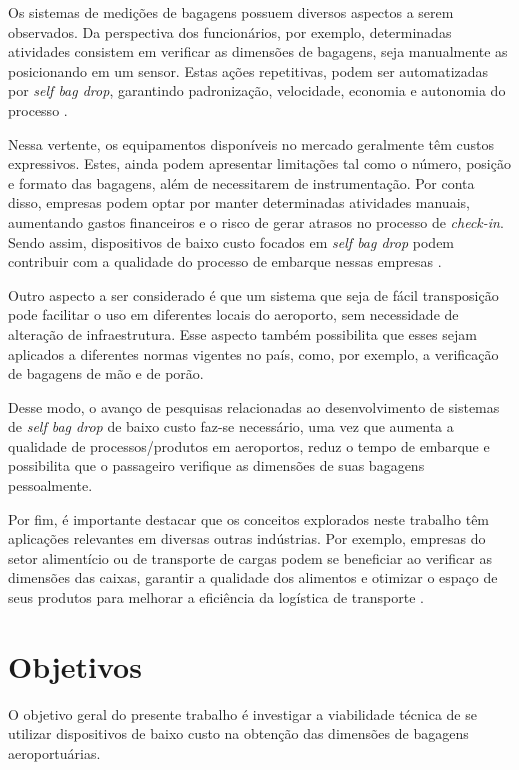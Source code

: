 Os sistemas de medições de bagagens possuem diversos aspectos a serem observados. Da perspectiva dos funcionários, por exemplo, determinadas atividades consistem em verificar as dimensões de bagagens, seja manualmente as posicionando em um sensor. Estas ações repetitivas, podem ser automatizadas por \textit{self bag drop}, garantindo padronização, velocidade, economia e autonomia do processo \cite{zheng_2018_smart, neethu_2015_role}.

Nessa vertente, os equipamentos disponíveis no mercado geralmente têm custos expressivos. Estes, ainda podem apresentar limitações tal como o número, posição e formato das bagagens, além de necessitarem de instrumentação. Por conta disso, empresas podem optar por manter determinadas atividades manuais, aumentando gastos financeiros e o risco de gerar atrasos no processo de \textit{check-in}. Sendo assim, dispositivos de baixo custo focados em \textit{self bag drop} podem contribuir com a qualidade do processo de embarque nessas empresas \cite{gao_2018_minimum}.

Outro aspecto a ser considerado é que um sistema que seja de fácil transposição pode facilitar o uso em diferentes locais do aeroporto, sem necessidade de alteração de infraestrutura. Esse aspecto também possibilita que esses sejam aplicados a diferentes normas vigentes no país, como, por exemplo, a verificação de bagagens de mão e de porão.

Desse modo, o avanço de pesquisas relacionadas ao desenvolvimento de sistemas de \textit{self bag drop} de baixo custo faz-se necessário, uma vez que aumenta a qualidade de processos/produtos em aeroportos, reduz o tempo de embarque e possibilita que o passageiro verifique as dimensões de suas bagagens pessoalmente.
	
Por fim, é importante destacar que os conceitos explorados neste trabalho têm aplicações relevantes em diversas outras indústrias. Por exemplo, empresas do setor alimentício ou de transporte de cargas podem se beneficiar ao verificar as dimensões das caixas, garantir a qualidade dos alimentos e otimizar o espaço de seus produtos para melhorar a eficiência da logística de transporte \cite{chen_2013_research, gomes_2012_applications}.
  
\section{Objetivos}
\label{sec_Objetivos}

O objetivo geral do presente trabalho é investigar a viabilidade técnica de se utilizar dispositivos de baixo custo na obtenção das dimensões de bagagens aeroportuárias.
    
